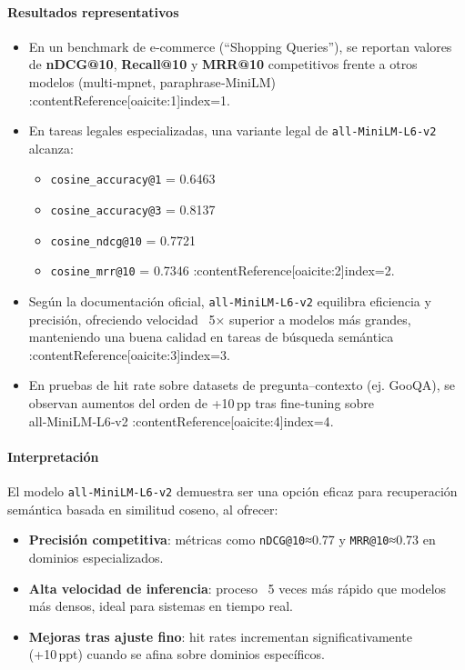 \documentclass[runningheads]{llncs}
\begin{document}
\paragraph{Resultados representativos}

\begin{itemize}
  \item En un benchmark de e‑commerce (“Shopping Queries”), se reportan valores de \textbf{nDCG@10}, \textbf{Recall@10} y \textbf{MRR@10} competitivos frente a otros modelos (multi‑mpnet, paraphrase‑MiniLM) :contentReference[oaicite:1]{index=1}.
  \item En tareas legales especializadas, una variante legal de \texttt{all‑MiniLM‑L6‑v2} alcanza:
  \begin{itemize}
    \item \texttt{cosine\_accuracy@1} = 0.6463  
    \item \texttt{cosine\_accuracy@3} = 0.8137  
    \item \texttt{cosine\_ndcg@10} = 0.7721  
    \item \texttt{cosine\_mrr@10} = 0.7346  
  :contentReference[oaicite:2]{index=2}.
  \end{itemize}
  \item Según la documentación oficial, \texttt{all‑MiniLM‑L6‑v2} equilibra eficiencia y precisión, ofreciendo velocidad ~5× superior a modelos más grandes, manteniendo una buena calidad en tareas de búsqueda semántica :contentReference[oaicite:3]{index=3}.
  \item En pruebas de hit rate sobre datasets de pregunta–contexto (ej. GooQA), se observan aumentos del orden de +10 pp tras fine‑tuning sobre all‑MiniLM‑L6‑v2 :contentReference[oaicite:4]{index=4}.
\end{itemize}

\paragraph{Interpretación}

El modelo \texttt{all‑MiniLM‑L6‑v2} demuestra ser una opción eficaz para recuperación semántica basada en similitud coseno, al ofrecer:
\begin{itemize}
  \item \textbf{Precisión competitiva}: métricas como \texttt{nDCG@10}≈0.77 y \texttt{MRR@10}≈0.73 en dominios especializados.
  \item \textbf{Alta velocidad de inferencia}: proceso ~5 veces más rápido que modelos más densos, ideal para sistemas en tiempo real.
  \item \textbf{Mejoras tras ajuste fino}: hit rates incrementan significativamente (+10 ppt) cuando se afina sobre dominios específicos.
\end{itemize}
\end{document}
